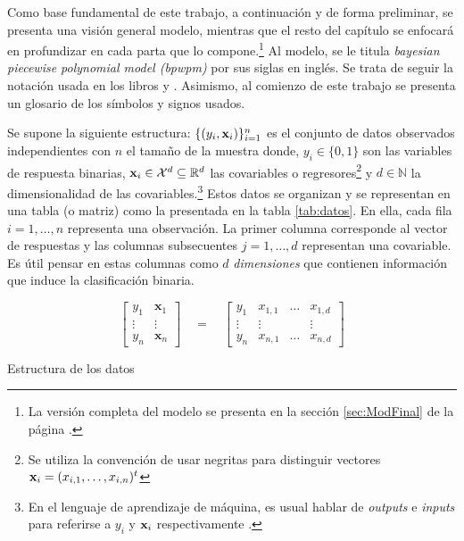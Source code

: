 \documentclass[../Main/Main.tex]{subfiles}
\begin{document}
Como base fundamental de este trabajo, a continuación y de forma preliminar, se presenta una visión general modelo, mientras que el resto del capítulo se enfocará en profundizar en cada parta que lo compone.\footnote{La versión completa del modelo se presenta en la sección \ref{sec:ModFinal} de la página \pageref{sec:ModFinal}.} Al modelo, se le titula \textit{bayesian piecewise polynomial model (bpwpm)} por sus siglas en inglés. Se trata de seguir la notación usada en los libros \citet{hastie2008elements} y \citet{james2013introduction}. Asimismo, al comienzo de este trabajo se presenta un glosario de los símbolos y signos usados.

Se supone la siguiente estructura: $\{(y_i,\mathbf{x}_i)\}_{i = 1}^n$ es el conjunto de datos observados independientes con $n$ el tamaño de la muestra donde, $y_i \in \{0,1\}$ son las variables de respuesta binarias, $\mathbf{x}_i \in \mathcal{X}^d \subseteq \mathbb{R}^d$ las covariables o regresores\footnote{Se utiliza la convención de usar negritas para distinguir vectores $\mathbf{x}_i = (x_{i,1},\ldots,x_{i,n})^t$} y $d \in \mathbb{N}$ la dimensionalidad de las covariables.\footnote{En el lenguaje de aprendizaje de máquina, es usual hablar de \textit{outputs} e \textit{inputs} para referirse a $y_i$ y $\mathbf{x}_i$ respectivamente \autocite{alpaydin2014introduction}.} Estos datos se organizan y se representan en una tabla (o matriz) como la presentada en la tabla \ref{tab:datos}. En ella, cada fila $i = 1,\ldots,n$ representa una observación. La primer columna corresponde al vector de respuestas y las columnas subsecuentes $j = 1,\ldots,d$ representan una covariable. Es útil pensar en estas columnas como $d$ \textit{dimensiones} que contienen información que induce la clasificación binaria.
\begin{table}[h]
$$
\left[\begin{array}{c|c} 
y_1 & \mathbf{x}_1 \\ 
\vdots & \vdots \\ 
y_n & \mathbf{x}_n \end{array}\right] 
\quad = \quad
\left[\begin{array}{c|ccc} 
y_1 & x_{1,1} & \ldots & x_{1,d} \\ 
\vdots & \vdots & ~ & \vdots \\ 
y_n & x_{n,1} & \ldots & x_{n,d}
\end{array}\right]
$$
\caption{Estructura de los datos}
\label{tab:datos}
\end{table}
\end{document}
